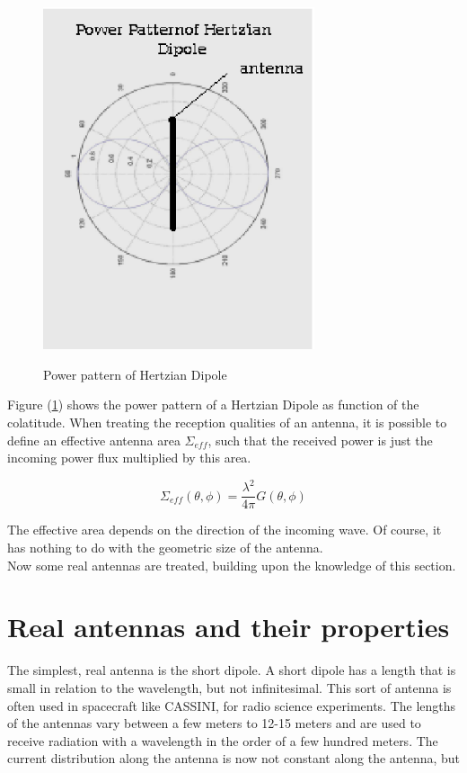 \documentclass[a4paper,14pt]{extbook}
\begin{document}
\begin{figure}
\begin{center}
  \includegraphics[width=8cm]{pp_hd}\\
  \caption{Power pattern of Hertzian Dipole}\label{fig_pp_hd}
\end{center}
\end{figure}

Figure (\ref{fig_pp_hd}) shows the power pattern of a Hertzian Dipole as function of the colatitude. When treating the reception qualities of an antenna, it is possible to define an effective antenna area $\Sigma_{eff}$, such that the received power is just the incoming power flux multiplied by this area.

\begin{equation}\label{effect_area}
\Sigma_{eff}(\theta,\phi)=\frac{\lambda^2}{4\pi}G(\theta,\phi)
\end{equation}

The effective area depends on the direction of the incoming wave. Of course, it has nothing to do with the geometric size of the antenna.\\

Now some real antennas are treated, building upon the knowledge of this section.

\section{Real antennas and their properties}

The simplest, real antenna is the short dipole. A short dipole has a length that is small in relation to the wavelength, but not infinitesimal. This sort of antenna is often used in spacecraft like CASSINI, for radio science experiments. The lengths of the antennas vary between a few meters to 12-15 meters and are used to receive radiation with a wavelength in the order of a few hundred meters. The current distribution along the antenna is now not constant along the antenna, but
\end{document}
